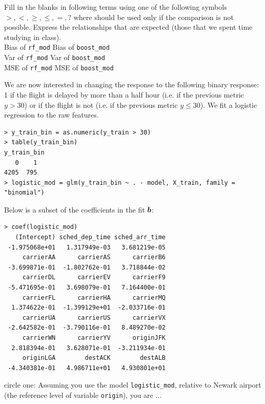 \documentclass[12pt]{article}
\begin{document}
\begin{enumerate}[(aa)]
 Fill in the blanks in following terms using one of the following symbols $>,<,\geq,\leq,=,?$ where  should be used only if the comparison is not possible. Express the relationships that are expected (those that we spent time studying in class).\\

Bias of \texttt{rf\_mod}   \iftoggle{solutions}{\inred{$?$}}{~\line(1,0){15}~}      Bias of \texttt{boost\_mod} \\

Var of \texttt{rf\_mod}   \iftoggle{solutions}{\inred{$?$}}{~\line(1,0){15}~}     Var of \texttt{boost\_mod} \\

MSE of \texttt{rf\_mod}   \iftoggle{solutions}{\inred{$?$}}{~\line(1,0){15}~}     MSE of \texttt{boost\_mod}

\pagebreak


We are now interested in changing the response to the following binary response: 1 if the flight is delayed by more than a half hour (i.e. if the previous metric $y > 30$) or if the flight is not (i.e. if the previous metric $y \leq 30$). We fit a logistic regression to the raw features. 

\begin{Verbatim}[fontsize=\small]
> y_train_bin = as.numeric(y_train > 30)
> table(y_train_bin)
y_train_bin
   0    1 
4205  795
> logistic_mod = glm(y_train_bin ~ . - model, X_train, family = "binomial")
\end{Verbatim}

Below is a subset of the coefficients in the fit $\boldsymbol{b}$:

\begin{Verbatim}[fontsize=\small]
> coef(logistic_mod)
   (Intercept) sched_dep_time sched_arr_time 
 -1.975068e+01   1.317949e-03   3.681219e-05 
     carrierAA      carrierAS      carrierB6 
 -3.699871e-01  -1.802762e-01   3.718844e-02 
     carrierDL      carrierEV      carrierF9 
 -5.471695e-01   3.698079e-01   7.164400e-01 
     carrierFL      carrierHA      carrierMQ 
  1.374622e-01  -1.399129e+01  -2.033716e-01 
     carrierUA      carrierUS      carrierVX 
 -2.642582e-01  -3.790116e-01   8.489270e-02 
     carrierWN      carrierYV      originJFK 
  2.818394e-01   3.628071e-01  -3.211934e-01  
     originLGA        destACK        destALB 
 -4.340381e-01   4.986711e+01   4.930801e+01 
\end{Verbatim}


 circle one: Assuming you use the model \texttt{logistic\_mod}, relative to Newark airport (the reference level of variable \texttt{origin}), you are ... \\


\end{enumerate}
\end{document}
